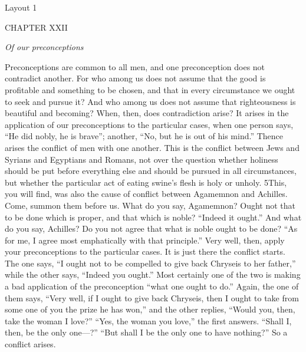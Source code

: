 

Layout 1

CHAPTER XXII

\emph{Of our preconceptions}

Preconceptions are common to all men, and one preconception does not contradict another. For who among us does not assume that the good is profitable and something to be chosen, and that in every circumstance we ought to seek and pursue it? And who among us does not assume that righteousness is beautiful and becoming? When, then, does contradiction arise? It arises in the application of our preconceptions to the particular cases, when one person says, ``He did nobly, he is brave''; another, ``No, but he is out of his mind.'' Thence arises the conflict of men with one another. This is the conflict between Jews and Syrians and Egyptians and Romans, not over the question whether holiness should be put before everything else and should be pursued in all circumstances, but whether the particular act of eating swine's flesh is holy or unholy. 5This, you will find, was also the cause of conflict between Agamemnon and Achilles. Come, summon them before us. What do you say, Agamemnon? Ought not that to be done which is proper, and that which is noble? ``Indeed it ought.'' And what do you say, Achilles? Do you not agree that what is noble ought to be done? ``As for me, I agree most emphatically with that principle.'' Very well, then, apply your preconceptions to the particular cases. It is just there the conflict starts. The one says, ``I ought not to be compelled to give back Chryseis to her father,'' while the other says, ``Indeed you ought.'' Most certainly one of the two is making a bad application of the preconception ``what one ought to do.'' Again, the one of them says, ``Very well, if I ought to give back Chryseis, then I ought to take from some one of you the prize he has won,'' and the other replies, ``Would you, then, take the woman I love?'' ``Yes, the woman you love,'' the first answers. ``Shall I, then, be the only one—?'' ``But shall I be the only one to have nothing?'' So a conflict arises.

